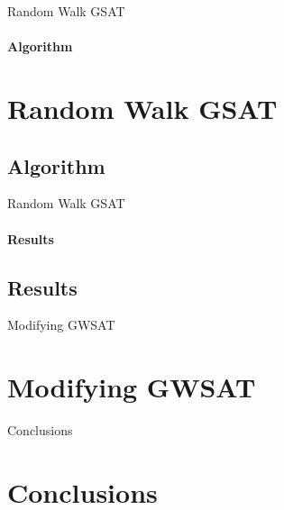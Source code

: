\documentclass{beamer}
\begin{document}
\begin{frame}{Random Walk GSAT}
\framesubtitle{Algorithm}
\section{Random Walk GSAT}
\subsection{Algorithm}
\end{frame}

\begin{frame}{Random Walk GSAT}
\framesubtitle{Results}
\subsection{Results}
\end{frame}


\begin{frame}{Modifying GWSAT}
\section{Modifying GWSAT}
\end{frame}

\begin{frame}{Conclusions}
\section{Conclusions}
\end{frame}
\end{document}
